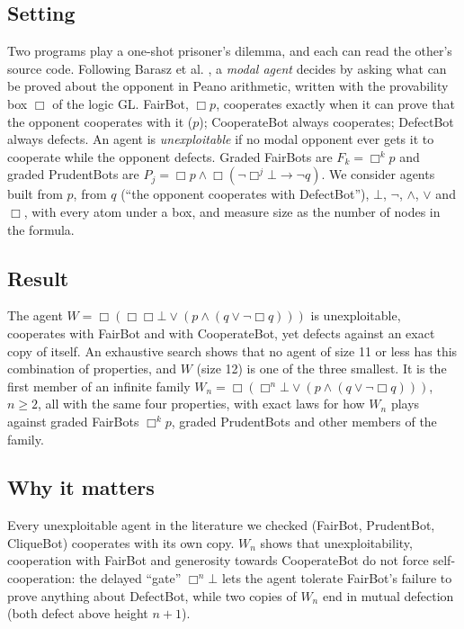 \documentclass{article}
\begin{document}
\subsection*{Setting}

Two programs play a one-shot prisoner's dilemma, and each can read the other's source code.
Following Barasz et al. \cite{barasz2014robust}, a \emph{modal agent} decides by asking what can be proved about the
opponent in Peano arithmetic, written with the provability box $\Box$ of the logic GL. FairBot,
$\Box p$, cooperates exactly when it can prove that the opponent cooperates with it
($p$); CooperateBot always cooperates; DefectBot always defects. An agent is \emph{unexploitable} if
no modal opponent ever gets it to cooperate while the opponent defects. Graded FairBots are $F_k = \Box^k p$ and graded PrudentBots are
$P_j = \Box p \wedge \Box(\neg\Box^j\bot \to \neg q)$. We consider agents
built from $p$, from $q$ (``the opponent cooperates with DefectBot''), $\bot$, $\neg$, $\wedge$,
$\vee$ and $\Box$, with every atom under a box, and measure size as the number of nodes in the
formula.

\subsection*{Result}

The agent $W = \Box(\Box\Box\bot \vee (p \wedge (q \vee \neg\Box q)))$ is unexploitable,
cooperates with FairBot and with CooperateBot, yet defects against an exact copy of itself. An
exhaustive search shows that no agent of size 11 or less has this combination of properties, and
$W$ (size 12) is one of the three smallest. It is the first member of an infinite family
$W_n = \Box(\Box^n\bot \vee (p \wedge (q \vee \neg\Box q)))$, $n \ge 2$, all with the same four
properties, with exact laws for how $W_n$ plays against graded FairBots $\Box^k p$, graded
PrudentBots and other members of the family.

\subsection*{Why it matters}

Every unexploitable agent in the literature we checked (FairBot, PrudentBot, CliqueBot)
cooperates with its own copy. $W_n$ shows that unexploitability, cooperation with FairBot and
generosity towards CooperateBot do not force self-cooperation: the delayed ``gate''
$\Box^n\bot$ lets the agent tolerate FairBot's failure to prove anything about DefectBot, while
two copies of $W_n$ end in mutual defection (both defect above height $n+1$).
\end{document}
